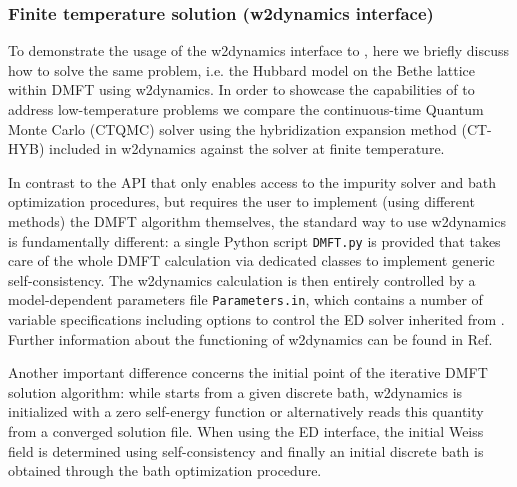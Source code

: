\documentclass[edipack2.tex]{subfiles}
\begin{document}
\subsubsection{Finite temperature solution (w2dynamics interface)}\label{SecExamplesBetheDMFTw2d}
To demonstrate the usage of the w2dynamics interface to \NAME,  here we briefly discuss how to solve the same problem, i.e. the Hubbard model on the Bethe lattice within DMFT using w2dynamics. 
In order to showcase the capabilities of \NAME to address low-temperature problems we compare the continuous-time Quantum Monte Carlo (CTQMC) solver using the hybridization expansion method (CT-HYB) included in w2dynamics against the \NAME solver at finite temperature.  

In contrast to the \NAME API that only enables access to the impurity solver and bath optimization procedures, but requires the user to implement (using different methods) the DMFT algorithm themselves, the standard way to use w2dynamics is fundamentally different: a single Python script {\tt DMFT.py} is provided that takes care of the whole DMFT calculation via dedicated classes to implement generic self-consistency. The w2dynamics calculation is then entirely controlled by a model-dependent parameters file {\tt Parameters.in}, which contains a number of variable specifications including options to control the ED solver inherited from \NAME. Further information about the functioning of w2dynamics can be found in Ref.~           

Another important difference concerns the initial point of the iterative DMFT solution algorithm: while \NAME starts from a given discrete bath, w2dynamics is initialized with a zero self-energy function or alternatively reads this quantity from a converged solution file. When using the \NAME ED interface, the initial Weiss field is determined using self-consistency and finally an initial discrete bath is obtained through the \NAME bath optimization procedure. 
\end{document}
